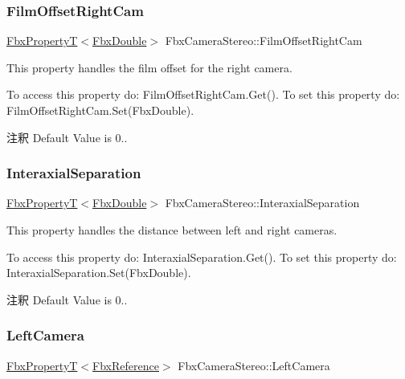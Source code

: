 \subsubsection{\texorpdfstring{Film\+Offset\+Right\+Cam}{FilmOffsetRightCam}}
{\footnotesize\ttfamily \hyperlink{class_fbx_property_t}{Fbx\+PropertyT}$<$\hyperlink{fbxtypes_8h_a171e72a1c46fc15c1a6c9c31948c1c5b}{Fbx\+Double}$>$ Fbx\+Camera\+Stereo\+::\+Film\+Offset\+Right\+Cam}

This property handles the film offset for the right camera.

To access this property do\+: Film\+Offset\+Right\+Cam.\+Get(). To set this property do\+: Film\+Offset\+Right\+Cam.\+Set(\+Fbx\+Double).

\begin{DoxyRemark}{注釈}
Default Value is 0.. 
\end{DoxyRemark}
\mbox{\label{class_fbx_camera_stereo_a93f63eb9bb9d1a9829db054abce1289d}} 
\subsubsection{\texorpdfstring{Interaxial\+Separation}{InteraxialSeparation}}
{\footnotesize\ttfamily \hyperlink{class_fbx_property_t}{Fbx\+PropertyT}$<$\hyperlink{fbxtypes_8h_a171e72a1c46fc15c1a6c9c31948c1c5b}{Fbx\+Double}$>$ Fbx\+Camera\+Stereo\+::\+Interaxial\+Separation}

This property handles the distance between left and right cameras.

To access this property do\+: Interaxial\+Separation.\+Get(). To set this property do\+: Interaxial\+Separation.\+Set(\+Fbx\+Double).

\begin{DoxyRemark}{注釈}
Default Value is 0.. 
\end{DoxyRemark}
\mbox{\label{class_fbx_camera_stereo_a92cc37f2c93f8920e66756ef4d947762}} 
\subsubsection{\texorpdfstring{Left\+Camera}{LeftCamera}}
{\footnotesize\ttfamily \hyperlink{class_fbx_property_t}{Fbx\+PropertyT}$<$\hyperlink{fbxtypes_8h_a44df6a2eec915cf27cd481e5c5e48a24}{Fbx\+Reference}$>$ Fbx\+Camera\+Stereo\+::\+Left\+Camera}

